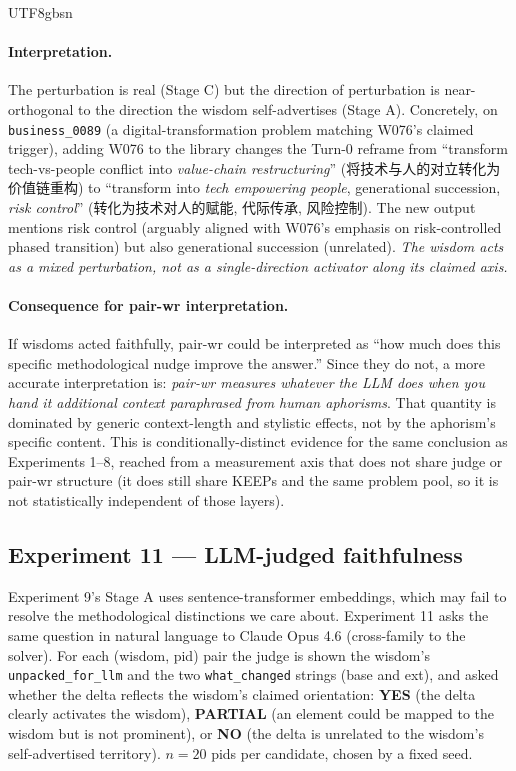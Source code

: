 \documentclass{article}
\begin{document}
\begin{CJK*}{UTF8}{gbsn}
\paragraph{Interpretation.} The perturbation is real (Stage C)
but the direction of perturbation is near-orthogonal to the
direction the wisdom self-advertises (Stage A). Concretely, on
\texttt{business\_0089} (a digital-transformation problem
matching W076's claimed trigger), adding W076 to the library
changes the Turn-0 reframe from ``transform tech-vs-people conflict
into \emph{value-chain restructuring}''
(将技术与人的对立转化为价值链重构)
to ``transform into \emph{tech empowering people}, generational
succession, \emph{risk control}''
(转化为技术对人的赋能, 代际传承, 风险控制). The new
output mentions risk control (arguably aligned with W076's emphasis
on risk-controlled phased transition) but also generational
succession (unrelated). \emph{The wisdom acts as a
mixed perturbation, not as a single-direction activator along its
claimed axis.}

\paragraph{Consequence for pair-wr interpretation.} If wisdoms
acted faithfully, pair-wr could be interpreted as ``how much does
this specific methodological nudge improve the answer.'' Since
they do not, a more accurate interpretation is:
\emph{pair-wr measures whatever the LLM does when you hand it
additional context paraphrased from human aphorisms}. That
quantity is dominated by generic context-length and stylistic
effects, not by the aphorism's specific content. This is
conditionally-distinct evidence for the same conclusion as
Experiments 1--8, reached from a measurement axis that does not
share judge or pair-wr structure (it does still share KEEPs and
the same problem pool, so it is not statistically independent of
those layers).

\subsection{Experiment 11 — LLM-judged faithfulness}
\label{sec:faith}

Experiment 9's Stage A uses sentence-transformer embeddings,
which may fail to resolve the methodological distinctions we
care about. Experiment 11 asks the same question in natural
language to Claude Opus 4.6 (cross-family to the solver). For
each (wisdom, pid) pair the judge is shown the wisdom's
\texttt{unpacked\_for\_llm} and the two \texttt{what\_changed}
strings (base and ext), and asked whether the delta reflects the
wisdom's claimed orientation: \textbf{YES} (the delta clearly
activates the wisdom), \textbf{PARTIAL} (an element could be
mapped to the wisdom but is not prominent), or \textbf{NO}
(the delta is unrelated to the wisdom's self-advertised
territory). \(n = 20\) pids per candidate, chosen by a fixed
seed.


\end{CJK*}
\end{document}
